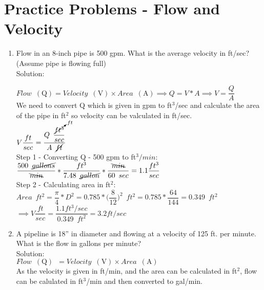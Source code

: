\section*{Practice Problems - Flow and Velocity}
\begin{enumerate}

\item Flow in an 8-inch pipe is 500 gpm. What is the average velocity in ft/sec? (Assume pipe is flowing full)\\
Solution:\\
\vspace{0.2cm}

$Flow \enspace(\mathrm{Q})= Velocity \enspace(\mathrm{V})  \times Area \enspace(\mathrm{A}) \implies Q=V*A \implies V=\dfrac{Q}{A}$\\
We need to convert Q which is given in gpm to ft${^3}$/sec and calculate the area of the pipe in ft${^2}$ so velocity can be valculated in ft/sec.\\
\vspace{0.2cm}
$ V \dfrac{ft}{sec} = \dfrac{Q \enspace \dfrac{\cancelto{ft}{ft^3}}{sec}}{A \enspace\cancel{ft}}$\\
\vspace{0.2cm}
Step 1 - Converting Q - 500 gpm to ft${^3}/min$:\\
\vspace{0.2cm}
$\dfrac{500 \enspace \cancel{gallons}}{\bcancel{min}}*\dfrac{ft^3}{7.48 \enspace \cancel{gallon}}*\dfrac{\bcancel{min}}{60 \enspace sec}=1.1\dfrac{ft^3}{sec}$\\
\vspace{0.2cm}
Step 2 - Calculating area in ft${^2}$:\\
\vspace{0.2cm}
$Area \enspace ft^2= \dfrac{\pi}{4}*D^2= 0.785*\Big(\dfrac{8}{12}\Big)^2 \enspace ft^2=0.785*\dfrac{64}{144}=0.349 \enspace ft^2$\\
\vspace{0.2cm}
$\implies V \dfrac{ft}{sec} = \dfrac{ 1.1 ft^3/sec}{0.349 \enspace ft^2} = \boxed{3.2 ft/sec}$\\
\vspace{0.3cm} 


\item A pipeline is 18” in diameter and flowing at a velocity of 125 ft. per minute. What is the flow in gallons per minute?\\
\vspace{0.2cm}
Solution:\\
$Flow \enspace(\mathrm{Q}) \enspace = Velocity \enspace(\mathrm{V})  \times Area \enspace(\mathrm{A})$\\
\vspace{0.2cm}
As the velocity is given in ft/min, and the area can be calculated in ft$^2$, flow can be calulated in ft$^3$/min and then converted to gal/min.\\
\vspace{0.2cm}


\end{enumerate}
